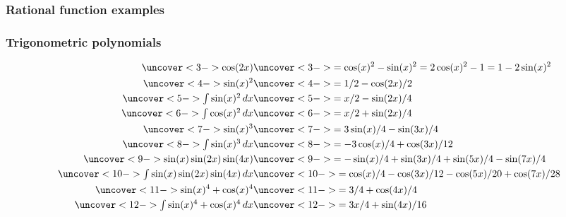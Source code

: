 \documentclass[9pt]{beamer}
\begin{document}
\begin{frame}[t]
 \frametitle{Rational function examples}
\end{frame}

\begin{frame}[t]
 \frametitle{Trigonometric polynomials}
 \begin{align*}
  \uncover<3->{\cos(2x)} &
  \uncover<3->{
   =\cos(x)^2-\sin(x)^2 = 2\cos(x)^2-1 = 1-2\sin(x)^2 \hphantom{m}
  } \\
  \uncover<4->{\sin(x)^2} &
  \uncover<4->{= 1/2-\cos(2x)/2 } \\
  \uncover<5->{\tint\sin(x)^2\,dx} &
  \uncover<5->{= x/2-\sin(2x)/4 } \\
  \uncover<6->{\tint\cos(x)^2\,dx} &
  \uncover<6->{= x/2+\sin(2x)/4 } \\
  \uncover<7->{\sin(x)^3} &
  \uncover<7->{= 3\sin(x)/4 - \sin(3x)/4} \\
  \uncover<8->{\tint \sin(x)^3\,dx} &
  \uncover<8->{= -3\cos(x)/4 + \cos(3x)/12} \\
  \uncover<9->{\sin(x)\sin(2x)\sin(4x)} &
  \uncover<9->{= -\sin(x)/4 + \sin(3x)/4 + \sin(5x)/4 - \sin(7x)/4} \\
  \uncover<10->{\tint\sin(x)\sin(2x)\sin(4x)\,dx} &
  \uncover<10->{= \cos(x)/4 - \cos(3x)/12 - \cos(5x)/20 + \cos(7x)/28}\\
  \uncover<11->{\sin(x)^4 + \cos(x)^4} &
  \uncover<11->{= 3/4 + \cos(4x)/4} \\
  \uncover<12->{\tint \sin(x)^4 + \cos(x)^4\,dx} &
  \uncover<12->{= 3x/4 + \sin(4x)/16} \\
 \end{align*}
\end{frame}
\end{document}
